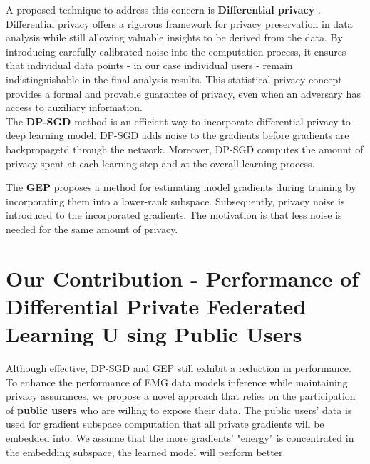 A proposed technique to address this concern is \textbf{Differential privacy} \cite{Dwork2013ThePrivacy}. \\
Differential privacy offers a rigorous framework for privacy preservation in data analysis while still allowing valuable insights to be derived from the data. By introducing carefully calibrated noise into the computation process, it ensures that individual data points - in our case individual users -  remain indistinguishable in the final analysis results. This statistical privacy concept provides a formal and provable guarantee of privacy, even when an adversary has access to auxiliary information.\\

The \textbf{DP-SGD} \cite{Abadi2016DeepPrivacy} method is an efficient way to incorporate differential privacy to deep learning model. DP-SGD adds noise to the gradients before gradients are backpropagetd through the network. Moreover, DP-SGD computes the amount of privacy spent at each learning step and at the overall learning process. 

The \textbf{GEP} \cite{Yu2021DoLearning} proposes a method for estimating model gradients during training by incorporating them into a lower-rank subspace. Subsequently, privacy noise is introduced to the incorporated gradients. The motivation is that less noise is needed for the same amount of privacy. \\

\section{Our Contribution - Performance of Differential Private Federated Learning U sing Public Users }
Although effective, DP-SGD and GEP still exhibit a reduction in performance. To enhance the performance of EMG data models inference while maintaining privacy assurances, we propose a novel approach that relies on the participation of \textbf{public users} who are willing to expose their data. The public users' data is used for gradient subspace computation that all private gradients will be embedded into. We assume that the more gradients' "energy" is concentrated in the embedding subspace, the learned model will perform better.\\




